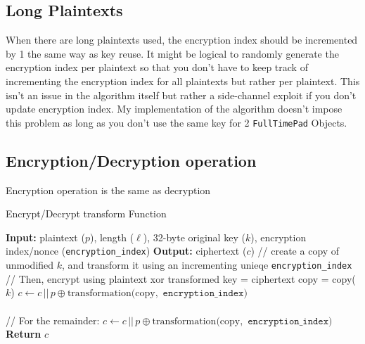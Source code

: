 \documentclass[fleqn, a4paper,12pt]{article}
\newcommand{\COMMENT}[1]{\State \textcolor[HTML]{003e57}{// #1}}
\begin{document}
\subsection {Long Plaintexts}

When there are long plaintexts used, the encryption index should be incremented by 1 the same way as key reuse. It might be logical to randomly generate the encryption index per plaintext so that you don't have to keep track of incrementing the encryption index for all plaintexts but rather per plaintext. This isn't an issue in the algorithm itself but rather a side-channel exploit if you don't update encryption index. My implementation of the algorithm doesn't impose this problem as long as you don't use the same key for 2 \texttt{FullTimePad} Objects.

\subsection {Encryption/Decryption operation}

Encryption operation is the same as decryption

\begin{algorithm}[H] %
\caption{Encrypt/Decrypt transform Function}
\begin{algorithmic}[1]  %
\State \textbf{Input:} plaintext ($p$), length ($\ell$), 32-byte original key ($k$), encryption index/nonce (\texttt{encryption\_index})
\State \textbf{Output:} ciphertext ($c$)
	\COMMENT{create a copy of unmodified $k$, and transform it using an incrementing unieqe \texttt{encryption\_index}}
	\COMMENT{Then, encrypt using plaintext xor transformed key = ciphertext}
	\State copy = copy($k$)
	\State $c \gets c \,||\, p \oplus \mathrm{transformation(copy, } \texttt{  encryption\_index})$
\EndFor\\
\\
\COMMENT{For the remainder:}
\State $c \gets c \,||\, p \oplus \mathrm{transformation(copy, } \texttt{  encryption\_index})$
\State \textbf{Return} $c$
\end{algorithmic}
\end{algorithm}
\end{document}
